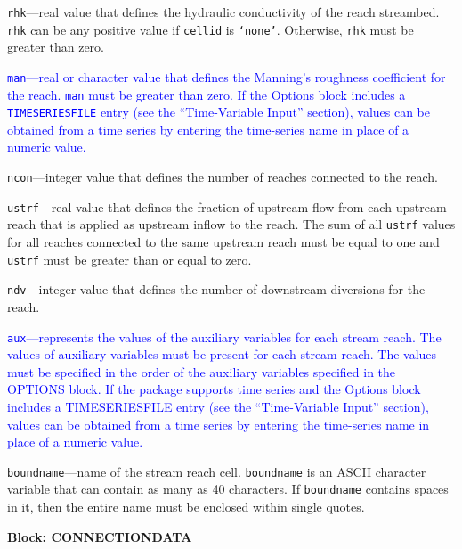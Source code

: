 \begin{description}
\item \texttt{rhk}---real value that defines the hydraulic conductivity of the reach streambed. \texttt{rhk} can be any positive value if \texttt{cellid} is \texttt{`none'}. Otherwise, \texttt{rhk} must be greater than zero.

\item \textcolor{blue}{\texttt{man}---real or character value that defines the Manning's roughness coefficient for the reach. \texttt{man} must be greater than zero.  If the Options block includes a \texttt{TIMESERIESFILE} entry (see the ``Time-Variable Input'' section), values can be obtained from a time series by entering the time-series name in place of a numeric value.}

\item \texttt{ncon}---integer value that defines the number of reaches connected to the reach.

\item \texttt{ustrf}---real value that defines the fraction of upstream flow from each upstream reach that is applied as upstream inflow to the reach. The sum of all \texttt{ustrf} values for all reaches connected to the same upstream reach must be equal to one and \texttt{ustrf} must be greater than or equal to zero.

\item \texttt{ndv}---integer value that defines the number of downstream diversions for the reach.

\item \textcolor{blue}{\texttt{aux}---represents the values of the auxiliary variables for each stream reach. The values of auxiliary variables must be present for each stream reach. The values must be specified in the order of the auxiliary variables specified in the OPTIONS block.  If the package supports time series and the Options block includes a TIMESERIESFILE entry (see the ``Time-Variable Input'' section), values can be obtained from a time series by entering the time-series name in place of a numeric value.}

\item \texttt{boundname}---name of the stream reach cell.  \texttt{boundname} is an ASCII character variable that can contain as many as 40 characters.  If \texttt{boundname} contains spaces in it, then the entire name must be enclosed within single quotes.

\end{description}
\item \textbf{Block: CONNECTIONDATA}

